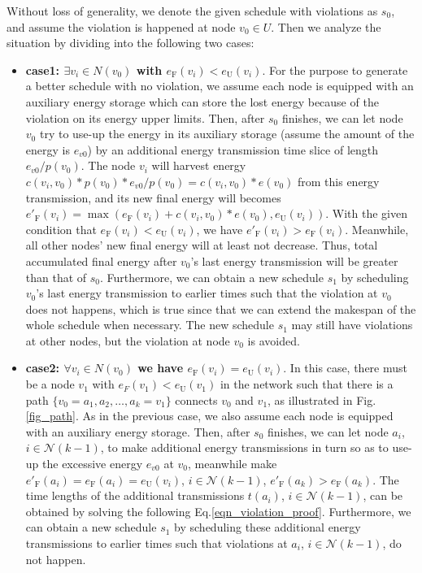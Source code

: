 \documentclass[journal,10pt]{IEEEtran}
\begin{document}
\begin{IEEEproof}
Without loss of generality, we denote the given schedule with violations as $s_0$, and assume the violation is happened at node $v_0{\in}U$. Then we analyze the situation by dividing into the following two cases:
\begin{itemize}
\item{\textbf{case1: ${\exists}v_i{\in}N(v_0)$ with $e_\text{F}(v_i){<}e_\text{U}(v_i)$}}.
For the purpose to generate a better schedule with no violation, we assume each node is equipped with an auxiliary energy storage which can store the lost energy because of the violation on its energy upper limits. Then, after $s_0$ finishes, we can let node $v_0$ try to use-up the energy in its auxiliary storage (assume the amount of the energy is $e_{v0}$) by an additional energy transmission time slice of length $e_{v0}/p(v_0)$. The node $v_i$ will harvest energy $c(v_i,v_0){*}p(v_0)*{e_{v0}{/}p(v_0)}{=}c(v_i,v_0){*}e(v_0)$ from this energy transmission, and its new final energy will becomes $e'_\text{F}(v_i){=}\max(e_\text{F}(v_i){+}c(v_i,v_0){*}e(v_0),e_\text{U}(v_i))$. With the given condition that $e_\text{F}(v_i){<}e_\text{U}(v_i)$, we have $e'_\text{F}(v_i){>}e_\text{F}(v_i)$. Meanwhile, all other nodes' new final energy will at least not decrease. Thus, total accumulated final energy after $v_0$'s last energy transmission will be greater than that of $s_0$. Furthermore, we can obtain a new schedule $s_1$ by scheduling $v_0$'s last energy transmission to earlier times such that the violation at $v_0$ does not happens, which is true since that we can extend the makespan of the whole schedule when necessary. The new schedule $s_1$ may still have violations at other nodes, but the violation at node $v_0$ is avoided.

\item{\textbf{case2: ${\forall}v_i{\in}N(v_0)$ we have $e_\text{F}(v_i){=}e_\text{U}(v_i)$}}.
In this case, there must be a node $v_1$ with $e_F(v_1){<}e_\text{U}(v_1)$ in the network such that there is a path $\{v_0{=}a_1,a_2,\ldots,a_k{=}v_1\}$ connects $v_0$ and $v_1$, as illustrated in Fig.\ref{fig_path}. As in the previous case, we also assume each node is equipped with an auxiliary energy storage. Then, after $s_0$ finishes, we can let node $a_i$,$i{\in}\mathcal{N}(k{-}1)$, to make additional energy transmissions in turn so as to use-up the excessive energy $e_{v0}$ at $v_0$, meanwhile make $e'_\text{F}(a_i){=}e_\text{F}(a_i){=}e_\text{U}(v_i)$, $i{\in}\mathcal{N}(k{-}1)$, $e'_\text{F}(a_k){>}e_\text{F}(a_k)$. The time lengths of the additional transmissions $t(a_i)$, $i{\in}\mathcal{N}(k{-}1)$, can be obtained by solving the following Eq.\eqref{eqn_violation_proof}. Furthermore, we can obtain a new schedule $s_1$ by scheduling these additional energy transmissions to earlier times such that violations at $a_i$, $i{\in}\mathcal{N}(k{-}1)$, do not happen.


\end{itemize}
\end{IEEEproof}
\end{document}
